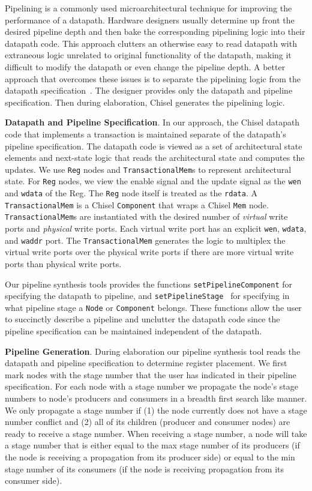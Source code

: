 Pipelining is a commonly used microarchitectural technique for
improving the performance of a datapath. Hardware designers usually
determine up front the desired pipeline depth and then bake the
corresponding pipelining logic into their datapath code. This approach
clutters an otherwise easy to read datapath with extraneous logic
unrelated to original functionality of the datapath, making it
difficult to modify the datapath or even change the pipeline depth. A
better approach that overcomes these issues is to separate the
pipelining logic from the datapath specification~\cite{hoe:syn}. The
designer provides only the datapath and pipeline specification. Then during
elaboration, Chisel generates the pipelining logic.

{\bf Datapath and Pipeline Specification}. In our approach, the Chisel
datapath code that implements a transaction is maintained separate of
the datapath's pipeline specification. The datapath code is viewed as
a set of architectural state elements and next-state logic that reads
the architectural state and computes the updates. We use {\tt Reg}
nodes and {\tt TransactionalMem}s to represent architectural
state. For {\tt Reg} nodes, we view the enable signal and the
update signal as the {\tt wen} and {\tt wdata} of the Reg. The {\tt Reg}
node itself is treated as the {\tt rdata}. A {\tt TransactionalMem} is
a Chisel {\tt Component} that wraps a Chisel {\tt Mem} node. 
{\tt TransactionalMem}s are instantiated with the desired number of
{\it virtual} write ports and {\it physical} write ports. Each
virtual write port has an explicit {\tt wen}, {\tt wdata}, and {\tt waddr}
port. The {\tt TransactionalMem} generates the logic to multiplex the
virtual write ports over the physical write ports if there are more
virtual write ports than physical write ports.

Our pipeline synthesis tools provides the functions
{\tt setPipelineComponent} for specifying the datapath to pipeline,
and {\tt setPipelineStage } for specifying in what pipeline stage a {\tt Node}
or {\tt Component} belongs. These functions allow the user to
succinctly describe a pipeline and unclutter the datapath code since
the pipeline specification can be maintained independent of the datapath.

{\bf Pipeline Generation}. During elaboration our pipeline synthesis
tool reads the datapath and pipeline specification to determine
register placement. We first mark nodes with the stage number that the
user has indicated in their pipeline specification. For each node with
a stage number we propagate the node's stage numbers to node's
producers and consumers in a breadth first search like manner. We only
propagate a stage number if (1) the node currently does not have a stage
number conflict and (2) all of its children (producer and consumer nodes)
are ready to receive a stage number. When receiving a stage number, a
node will take a stage number that is either equal to the max stage number of
its producers (if the node is receiving a propagation from its producer
side) or equal to the min stage number of its consumers (if the node is
receiving propagation from its consumer side).

